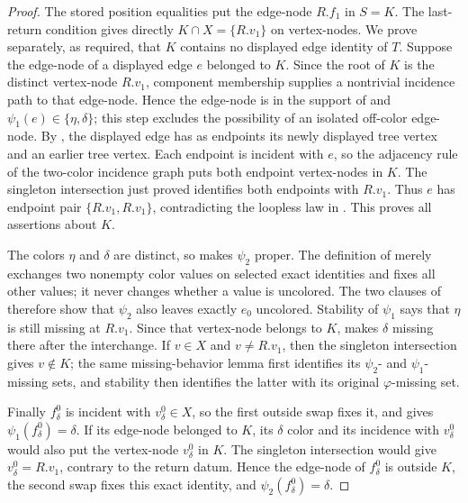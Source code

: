 \begin{proof}
The stored position equalities put the edge-node $R.f_1$ in $S=K$.
The last-return condition gives directly
$K\cap X=\{R.v_1\}$ on vertex-nodes.  We prove separately, as required,
that $K$ contains no displayed edge identity of $T$.  Suppose the
edge-node of a displayed edge $e$ belonged to $K$.  Since the root of
$K$ is the distinct vertex-node $R.v_1$, component membership supplies a
nontrivial incidence path to that edge-node.  Hence the edge-node is in
the support of  and
$\psi_1(e)\in\{\eta,\delta\}$; this step excludes the possibility of an
isolated off-color edge-node.  By , the displayed
edge has as endpoints its newly displayed tree vertex and an earlier tree
vertex.  Each endpoint is incident with $e$, so the adjacency rule of the
two-color incidence graph puts both endpoint vertex-nodes in $K$.  The
singleton intersection just proved identifies both endpoints with
$R.v_1$.  Thus $e$ has endpoint pair
$\{R.v_1,R.v_1\}$, contradicting the loopless law in
.  This proves all assertions about $K$.

The colors $\eta$ and $\delta$ are distinct, so
 makes $\psi_2$ proper.  The
definition of  merely exchanges two
nonempty color values on selected exact identities and fixes all other
values; it never changes whether a value is uncolored.  The two clauses of
 therefore show that $\psi_2$ also leaves
exactly $e_0$ uncolored.  Stability of $\psi_1$ says that $\eta$ is still
missing at $R.v_1$.  Since that vertex-node belongs to $K$,
 makes $\delta$ missing
there after the interchange.  If $v\in X$ and $v\ne R.v_1$, then the
singleton intersection gives $v\notin K$; the same missing-behavior lemma
first identifies its $\psi_2$- and $\psi_1$-missing sets, and stability
then identifies the latter with its original $\varphi$-missing set.

Finally $f^0_\delta$ is incident with
$v^0_\delta\in X$, so the first outside swap fixes it, and
 gives
$\psi_1(f^0_\delta)=\delta$.  If its edge-node belonged to $K$, its
$\delta$ color and its incidence with $v^0_\delta$ would also put the
vertex-node $v^0_\delta$ in $K$.  The singleton intersection would give
$v^0_\delta=R.v_1$, contrary to the return datum.  Hence the edge-node of
$f^0_\delta$ is outside $K$, the second swap fixes this exact identity,
and $\psi_2(f^0_\delta)=\delta$.
\end{proof}
